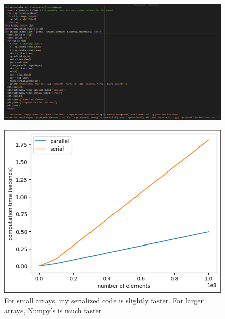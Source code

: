 \documentclass[12pt]{article}
\begin{document}
\begin{figure}[H]
    \centering
    \includegraphics[width=1.0\textwidth]{./ufunc_analysis_code.png} %
\end{figure}

\begin{figure}[H]
    \centering
    \includegraphics[width=1.0\textwidth]{./ufunc_analysis_plot.png} %
	\caption{For small arrays, my serialized code is slightly faster. For larger arrays, Numpy's is much faster}
\end{figure}
\end{document}
